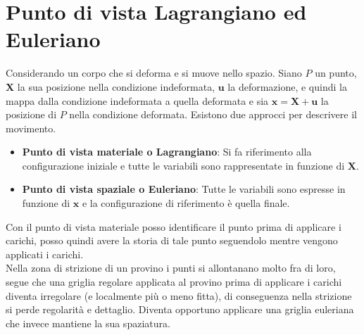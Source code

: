 \section{Punto di vista Lagrangiano ed Euleriano}

Considerando un corpo che si deforma e si muove nello spazio. Siano $P$ un punto, $\mathbf{X}$ la sua posizione nella condizione indeformata, $\mathbf{u}$ la deformazione, e quindi la mappa dalla condizione indeformata a quella deformata e sia $\mathbf{x} = \mathbf{X} +\mathbf{u}$ la posizione di $P$ nella condizione deformata. Esistono due approcci per descrivere il movimento.

\begin{itemize}
    \item \textbf{Punto di vista materiale o Lagrangiano}: Si fa riferimento alla configurazione iniziale e tutte le variabili sono rappresentate in funzione di $\mathbf{X}$.
    
    \item \textbf{Punto di vista spaziale o Euleriano}: Tutte le variabili sono espresse in funzione di $\mathbf{x}$ e la configurazione di riferimento è quella finale.
\end{itemize}

Con il punto di vista materiale posso identificare il punto prima di applicare i carichi, posso quindi avere la storia di tale punto seguendolo mentre vengono applicati i carichi.\\
Nella zona di strizione di un provino i punti si allontanano molto fra di loro, segue che una griglia regolare applicata al provino prima di applicare i carichi diventa irregolare (e localmente più o meno fitta), di conseguenza nella strizione si perde regolarità e dettaglio.
Diventa opportuno applicare una griglia euleriana che invece mantiene la sua spaziatura.


